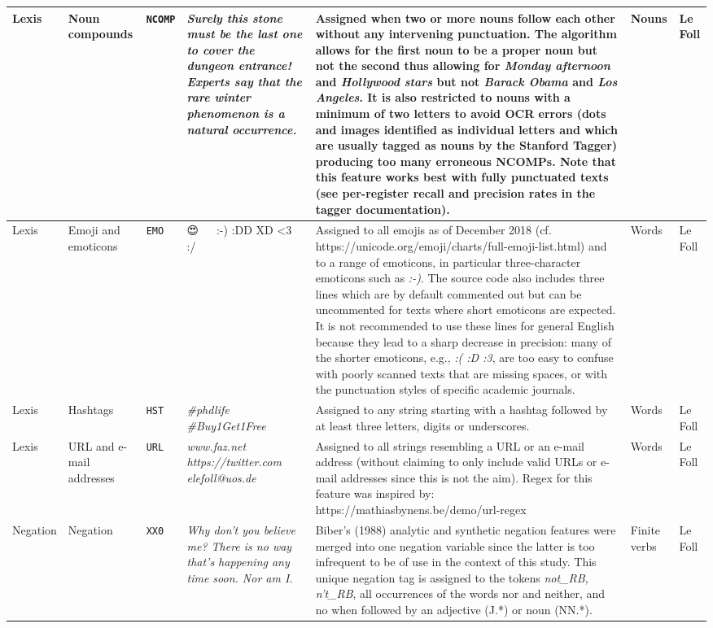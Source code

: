 \documentclass[
  letterpaper,
  DIV=11,
  numbers=noendperiod]{scrreprt}
\begin{document}
\begin{table}[htbp]
\begin{tabular}{|l|l|l|l|l|l|l|}
Lexis & Noun compounds & \texttt{NCOMP} & \textit{Surely this stone must be the last one to cover the dungeon entrance! Experts say that the rare winter phenomenon is a natural occurrence.} & Assigned when two or more nouns follow each other without any intervening punctuation. The algorithm allows for the first noun to be a proper noun but not the second thus allowing for \textit{Monday afternoon} and \textit{Hollywood stars} but not \textit{Barack Obama} and \textit{Los Angeles}. It is also restricted to nouns with a minimum of two letters to avoid OCR errors (dots and images identified as individual letters and which are usually tagged as nouns by the Stanford Tagger) producing too many erroneous NCOMPs. Note that this feature works best with fully punctuated texts (see per-register recall and precision rates in the tagger documentation). & Nouns & Le Foll \\ \hline
Lexis & Emoji and emoticons & \texttt{EMO} & 😍 🥰 🌈 :-) :DD XD <3 :/ & Assigned to all emojis as of December 2018 (cf. https://unicode.org/emoji/charts/full-emoji-list.html) and to a range of emoticons, in particular three-character emoticons such as \textit{:-)}. The source code also includes three lines which are by default commented out but can be uncommented for texts where short emoticons are expected. It is not recommended to use these lines for general English because they lead to a sharp decrease in precision: many of the shorter emoticons, e.g., \textit{:( :D :3}, are too easy to confuse with poorly scanned texts that are missing spaces, or with the punctuation styles of specific academic journals.  & Words & Le Foll \\ \hline
Lexis & Hashtags & \texttt{HST} & \textit{\#phdlife \#Buy1Get1Free} & Assigned to any string starting with a hashtag followed by at least three letters, digits or underscores. & Words & Le Foll \\ \hline
Lexis & URL and e-mail addresses & \texttt{URL} & \textit{www.faz.net https://twitter.com elefoll@uos.de} & Assigned to all strings resembling a URL or an e-mail address (without claiming to only include valid URLs or e-mail addresses since this is not the aim). Regex for this feature was inspired by: https://mathiasbynens.be/demo/url-regex & Words & Le Foll \\ \hline
Negation & Negation & \texttt{XX0} & \textit{Why don’t you believe me? There is no way that’s happening any time soon. Nor am I.} & Biber’s (1988) analytic and synthetic negation features were merged into one negation variable since the latter is too infrequent to be of use in the context of this study. This unique negation tag is assigned to the tokens \textit{not\_RB, n’t\_RB}, all occurrences of the words nor and neither, and no when followed by an adjective (J.*) or noun (NN.*). & Finite verbs & Le Foll \\ \hline

\end{tabular}
\end{table}
\end{document}
